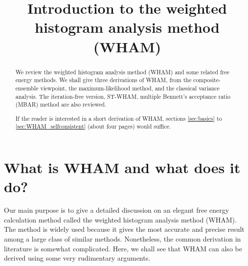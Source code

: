 \documentclass[aip,jcp,preprint,superscriptaddress]{revtex4-1}
\begin{document}
\newcommand{\vct}[1]{\mathbf{#1}}
\newcommand{\vx}{\vct{x}}
\newcommand{\vy}{\vct{y}}
\newcommand{\Z}{\mathcal{Z}}
\newcommand{\E}{\mathcal{E}}
\newcommand{\Ham}{\mathcal{H}}
\newcommand{\W}{\mathcal{W}}
\newcommand{\A}{\mathcal{A}}
\newcommand{\LL}{\mathcal{L}}
\newcommand{\var}{\mathrm{var}}
\newcommand{\com}{\mathrm{com}}

\newcommand{\llbra}{[\![}
\newcommand{\llket}{]\!]}

\newcommand{\repl}[2]{{\color{gray} [#1] }{\color{blue} #2}}
\newcommand{\add}[1]{{\color{blue} #1}}
\newcommand{\del}[1]{{\color{gray} [#1]}}
\newcommand{\note}[1]{{\color{OliveGreen}\small [\textbf{Comment.} #1]}}





\title{Introduction to the weighted histogram analysis method (WHAM)}


\begin{abstract}
  We review the weighted histogram analysis method (WHAM)
  and some related free energy methods.
  We shall give three derivations of WHAM,
  from the composite-ensemble viewpoint,
  the maximum-likelihood method,
  and the classical variance analysis.
  The iteration-free version, ST-WHAM,
  multiple Bennett's acceptance ratio (MBAR) method
  are also reviewed.

  If the reader is interested in a short
  derivation of WHAM, sections
  \ref{sec:basics} to \ref{sec:WHAM_selfconsistent} (about four pages)
  would suffice.
\end{abstract}

\maketitle

\tableofcontents



\section{\label{sec:intro}
What is WHAM and what does it do?}



Our main purpose is
to give a detailed discussion on
an elegant free energy calculation method called
the weighted histogram analysis method (WHAM)\cite{
ferrenberg1988, *ferrenberg1989, kumar1992,
newman, frenkel}.
%
The method is widely used because
it gives the most accurate and precise result
among a large class of similar methods.
%
Nonetheless,
the common derivation in literature
is somewhat complicated.
%
Here, we shall see that
WHAM can also be derived
using some very rudimentary arguments.
\end{document}
